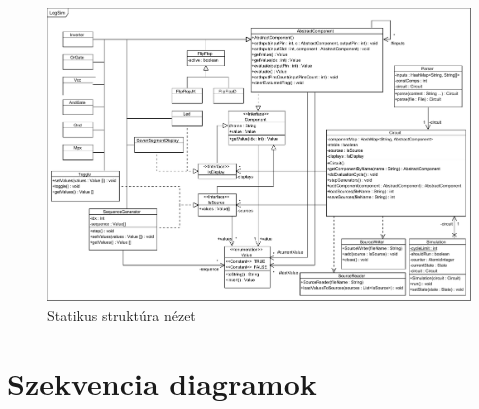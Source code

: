 \begin{figure}[H]
\begin{center}
\includegraphics[angle=90, width=17cm]{chapters/chapter04/classdiagram/class.pdf}
\caption{Statikus struktúra nézet}
\label{fig:class_diagram}
\end{center}
\end{figure}
%
%
%

\section{Szekvencia diagramok}

